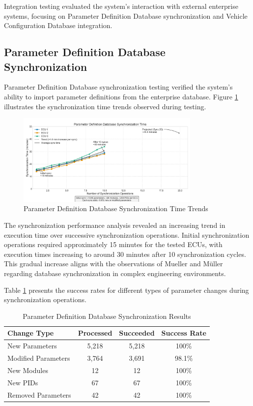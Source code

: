 Integration testing evaluated the system's interaction with external enterprise systems, focusing on Parameter Definition Database synchronization and Vehicle Configuration Database integration.

\subsection{Parameter Definition Database Synchronization}
\label{subsec:pdd-synchronization-testing}

Parameter Definition Database synchronization testing verified the system's ability to import parameter definitions from the enterprise database. Figure \ref{fig:pdd-sync-time} illustrates the synchronization time trends observed during testing.

\begin{figure}[h]
    \centering
    \includegraphics[width=0.8\textwidth]{figures/pdd_sync_time_graph.png}
    \caption{Parameter Definition Database Synchronization Time Trends}
    \label{fig:pdd-sync-time}
\end{figure}

The synchronization performance analysis revealed an increasing trend in execution time over successive synchronization operations. Initial synchronization operations required approximately 15 minutes for the tested \acp{ECU}, with execution times increasing to around 30 minutes after 10 synchronization cycles. This gradual increase aligns with the observations of Mueller and Müller \cite{mueller2018conception} regarding database synchronization in complex engineering environments.

Table \ref{tab:pdd-sync-results} presents the success rates for different types of parameter changes during synchronization operations.

\begin{table}[h]
\centering
\caption{Parameter Definition Database Synchronization Results}
\label{tab:pdd-sync-results}
\begin{tabular}{|l|c|c|c|}
\hline
\textbf{Change Type} & \textbf{Processed} & \textbf{Succeeded} & \textbf{Success Rate} \\
\hline
New Parameters & 5,218 & 5,218 & 100\% \\
\hline
Modified Parameters & 3,764 & 3,691 & 98.1\% \\
\hline
New Modules & 12 & 12 & 100\% \\
\hline
New \acp{PID} & 67 & 67 & 100\% \\
\hline
Removed Parameters & 42 & 42 & 100\% \\
\hline
\end{tabular}
\end{table}

